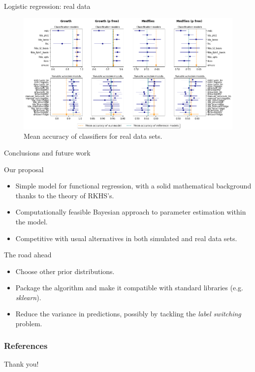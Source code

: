 \documentclass[10pt, english, professionalfonts]{beamer}
\begin{document}
\begin{frame}{Logistic regression: real data}
    \vspace{1em}
  \begin{figure}
    \includegraphics[width=\textwidth]{img/clf_emcee_real}
    \caption{Mean accuracy of classifiers for real data sets.}
  \end{figure}
\end{frame}

\begin{frame}{Conclusions and future work}

  \begin{alertblock}{Our proposal}
    \begin{itemize}
      \item Simple model for functional regression, with a solid mathematical background thanks to the theory of RKHS's.
      \item Computationally feasible Bayesian approach to parameter estimation within the model.
      \item Competitive with usual alternatives in both simulated and real data sets.
    \end{itemize}
  \end{alertblock}

  \begin{exampleblock}{The road ahead}
    \begin{itemize}
      \item Choose other prior distributions.
      \item Package the algorithm and make it compatible with standard libraries (e.g. \textit{sklearn}).
      \item Reduce the variance in predictions, possibly by tackling the \textit{label switching} problem.
    \end{itemize}
  \end{exampleblock}


\end{frame}

\begin{frame}[allowframebreaks]
    \frametitle{References}
    \nocite{*}
    \printbibliography[heading=none]
\end{frame}

\begin{frame}[standout]
  Thank you!
\end{frame}
\end{document}
